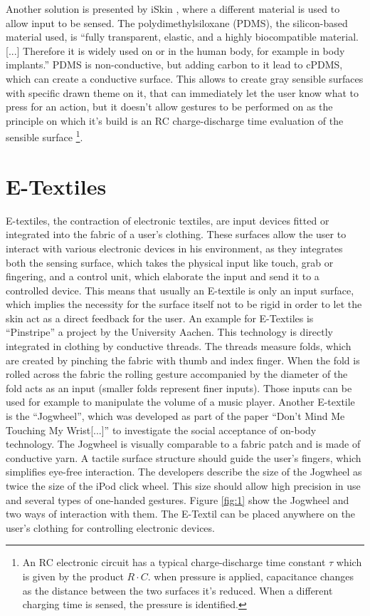 \documentclass{sigchi}
\begin{document}
Another solution is presented by iSkin \cite{iSkin}, where a different material is used to allow input to be sensed. The polydimethylsiloxane (PDMS), the silicon-based material used, is “fully transparent, elastic, and a highly biocompatible material. [...] Therefore it is widely used on or in the human body, for example in body implants.” \cite[p. 2994]{iSkin} PDMS is non-conductive, but adding carbon to it lead to cPDMS, which can create a conductive surface. This allows to create gray sensible surfaces with specific drawn theme on it, that can immediately let the user know what to press for an action, but it doesn’t allow gestures to be performed on as the principle on which it’s build is an RC charge-discharge time evaluation of the sensible surface \footnote{An RC electronic circuit has a typical charge-discharge time constant $\tau$ which is given by the product $R \cdot C$. when pressure is applied, capacitance changes as the distance between the two surfaces it’s reduced. When a different charging time is sensed, the pressure is identified.}.

\section{E-Textiles}
E-textiles, the contraction of electronic textiles, are input devices fitted or integrated into the fabric of a user's clothing. These surfaces allow the user to interact with various electronic devices in his environment, as they integrates both the sensing surface, which takes the physical input like touch, grab or fingering,  and a control unit, which elaborate the input and send it to a controlled device. This means that usually an E-textile is only an input surface, which implies the necessity for the surface itself not to be rigid in order to let the skin act as a direct feedback for the user.
An example for E-Textiles is “Pinstripe” a project by the University Aachen\cite{pinstripe}. This technology is directly integrated in clothing by conductive threads. The threads measure folds, which are created by pinching the fabric with thumb and index finger. When the fold is rolled across the fabric the rolling gesture accompanied by the diameter of the fold acts as an input (smaller folds represent finer inputs). Those inputs can be used for example to manipulate the volume of a music player. %
Another E-textile is the ``Jogwheel'', which was developed as part of the paper ``Don't Mind Me Touching My Wrist[...]'' \cite{touch-wrist} to investigate the social acceptance of on-body technology. The Jogwheel is visually comparable to a fabric patch and is made of conductive yarn. A tactile surface structure should guide the user's fingers, which simplifies eye-free interaction. The developers describe the size of the Jogwheel as twice the size of the iPod click wheel. This size should allow high precision in use and several types of one-handed gestures.
Figure \ref{fig:1} show the Jogwheel and two ways of interaction with them. The E-Textil can be placed anywhere on the user's clothing for controlling electronic devices. \cite{touch-wrist}
\end{document}
